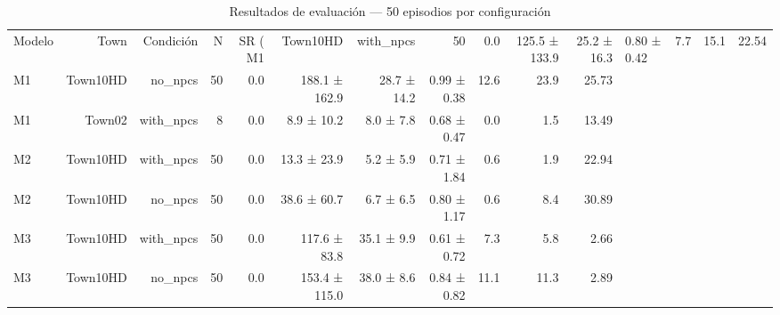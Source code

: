 \begin{table}[t]
\centering
\caption{Resultados de evaluación — 50 episodios por configuración}
\label{tab:eval_results}
\begin{tabular}{lrrrrrrrrrr}
\toprule
Modelo & Town & Condición & N & SR (%
\midrule
M1 & Town10HD & with_npcs & 50 & 0.0 & 125.5 ± 133.9 & 25.2 ± 16.3 & 0.80 ± 0.42 & 7.7 & 15.1 & 22.54 \\
M1 & Town10HD & no_npcs & 50 & 0.0 & 188.1 ± 162.9 & 28.7 ± 14.2 & 0.99 ± 0.38 & 12.6 & 23.9 & 25.73 \\
M1 & Town02 & with_npcs & 8 & 0.0 & 8.9 ± 10.2 & 8.0 ± 7.8 & 0.68 ± 0.47 & 0.0 & 1.5 & 13.49 \\
M2 & Town10HD & with_npcs & 50 & 0.0 & 13.3 ± 23.9 & 5.2 ± 5.9 & 0.71 ± 1.84 & 0.6 & 1.9 & 22.94 \\
M2 & Town10HD & no_npcs & 50 & 0.0 & 38.6 ± 60.7 & 6.7 ± 6.5 & 0.80 ± 1.17 & 0.6 & 8.4 & 30.89 \\
M3 & Town10HD & with_npcs & 50 & 0.0 & 117.6 ± 83.8 & 35.1 ± 9.9 & 0.61 ± 0.72 & 7.3 & 5.8 & 2.66 \\
M3 & Town10HD & no_npcs & 50 & 0.0 & 153.4 ± 115.0 & 38.0 ± 8.6 & 0.84 ± 0.82 & 11.1 & 11.3 & 2.89 \\
\bottomrule
\end{tabular}
\end{table}
